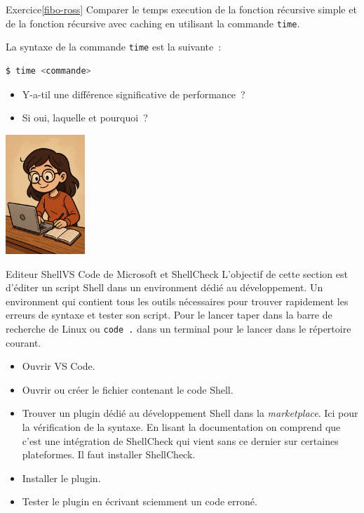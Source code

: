 \documentclass{beamer}
\begin{document}
    \begin{frame}[fragile]{Exercice\cref{fibo-ross} \execcounterdispinc{}}
        Comparer le temps execution de la fonction récursive simple et de la fonction récursive avec caching en utilisant la commande \lstinline{time}.

        La syntaxe de la commande \lstinline{time} est la suivante~:
        \begin{lstlisting}[language=bash]
$ time <commande>
        \end{lstlisting}
        \begin{itemize}
            \item Y-a-til une différence significative de performance~?
            \item Si oui, laquelle et pourquoi~?
        \end{itemize}
        \begin{center}
            \includegraphics[width=3cm]{image/student-in-front-of-desktop}
        \end{center}
    \end{frame}

    \begin{frame}{Editeur Shell}{VS Code de Microsoft et ShellCheck}
        L'objectif de cette section est d'éditer un script Shell dans un environment dédié au développement.
        Un environment qui contient tous les outils nécessaires pour trouver rapidement les erreurs de syntaxe et tester son script.
        \bigbreak
        Pour le lancer taper  dans la barre de recherche de Linux ou \lstinline{code .} dans un terminal pour le lancer dans le répertoire courant.
        \begin{itemize}
            \item Ouvrir VS Code.
            \item Ouvrir ou créer le fichier contenant le code Shell.
            \item Trouver un plugin dédié au développement Shell dans la \textit{marketplace}.
            Ici  pour la vérification de la syntaxe.
            En lisant la documentation on comprend que c'est une intégration de ShellCheck qui vient sans ce dernier sur certaines plateformes.
            Il faut installer ShellCheck.
            \item Installer le plugin.
            \item Tester le plugin en écrivant sciemment un code erroné.
        \end{itemize}
    \end{frame}
\end{document}
